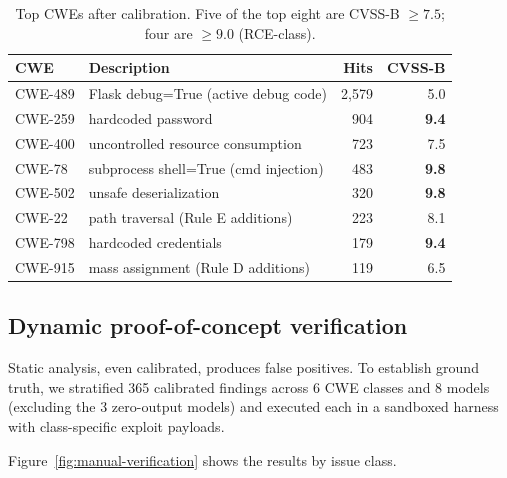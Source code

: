 \documentclass{article}
\begin{document}
\begin{table}[h]
\centering\small
\begin{tabular}{llrr}
\toprule
CWE & Description & Hits & CVSS-B \\
\midrule
CWE-489 & Flask debug=True (active debug code) & 2,579 & 5.0 \\
CWE-259 & hardcoded password                   &   904 & \textbf{9.4} \\
CWE-400 & uncontrolled resource consumption     &   723 & 7.5 \\
CWE-78  & subprocess shell=True (cmd injection) &   483 & \textbf{9.8} \\
CWE-502 & unsafe deserialization                &   320 & \textbf{9.8} \\
CWE-22  & path traversal (Rule E additions)     &   223 & 8.1 \\
CWE-798 & hardcoded credentials                 &   179 & \textbf{9.4} \\
CWE-915 & mass assignment (Rule D additions)    &   119 & 6.5 \\
\bottomrule
\end{tabular}
\caption{Top CWEs after calibration. Five of the top eight are CVSS-B
$\ge 7.5$; four are $\ge 9.0$ (RCE-class).}
\label{tab:topcwes}
\end{table}

\subsection{Dynamic proof-of-concept verification}
\label{sec:manual-verification}

Static analysis, even calibrated, produces false positives. To establish
ground truth, we stratified 365 calibrated findings across 6 CWE classes
and 8 models (excluding the 3 zero-output models) and executed each in a
sandboxed harness with class-specific exploit payloads.

Figure~\ref{fig:manual-verification} shows the results by issue class.
\end{document}

